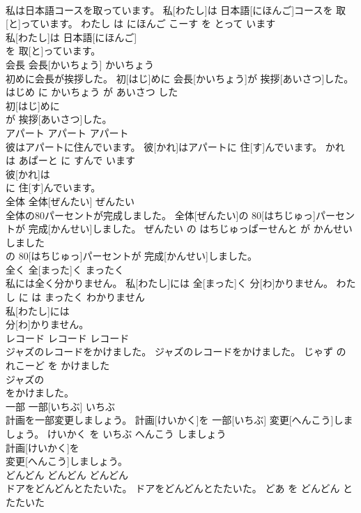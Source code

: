\documentclass[8pt]{extreport}
\begin{document}
\begin{CJK}{UTF8}{min}
\\	私は日本語コースを取っています。	私[わたし]は 日本語[にほんご]コースを 取[と]っています。	わたし は にほんご こーす を とって います	
\\	私[わたし]は 日本語[にほんご]
\\	を 取[と]っています。			
\\	会長	会長[かいちょう]	かいちょう	
\\	初めに会長が挨拶した。	初[はじ]めに 会長[かいちょう]が 挨拶[あいさつ]した。	はじめ に かいちょう が あいさつ した	
\\	初[はじ]めに
\\	が 挨拶[あいさつ]した。			
\\	アパート	アパート	アパート	
\\	彼はアパートに住んでいます。	彼[かれ]はアパートに 住[す]んでいます。	かれ は あぱーと に すんで います	
\\	彼[かれ]は
\\	に 住[す]んでいます。			
\\	全体	全体[ぜんたい]	ぜんたい	
\\	全体の80パーセントが完成しました。	全体[ぜんたい]の 80[はちじゅっ]パーセントが 完成[かんせい]しました。	ぜんたい の はちじゅっぱーせんと が かんせい しました	
\\	の 80[はちじゅっ]パーセントが 完成[かんせい]しました。			
\\	全く	全[まった]く	まったく	
\\	私には全く分かりません。	私[わたし]には 全[まった]く 分[わ]かりません。	わたし に は まったく わかりません	
\\	私[わたし]には
\\	分[わ]かりません。			
\\	レコード	レコード	レコード	
\\	ジャズのレコードをかけました。	ジャズのレコードをかけました。	じゃず の れこーど を かけました	
\\	ジャズの
\\	をかけました。			
\\	一部	一部[いちぶ]	いちぶ	
\\	計画を一部変更しましょう。	計画[けいかく]を 一部[いちぶ] 変更[へんこう]しましょう。	けいかく を いちぶ へんこう しましょう	
\\	計画[けいかく]を
\\	変更[へんこう]しましょう。			
\\	どんどん	どんどん	どんどん	
\\	ドアをどんどんとたたいた。	ドアをどんどんとたたいた。	どあ を どんどん と たたいた	

\end{CJK}
\end{document}
